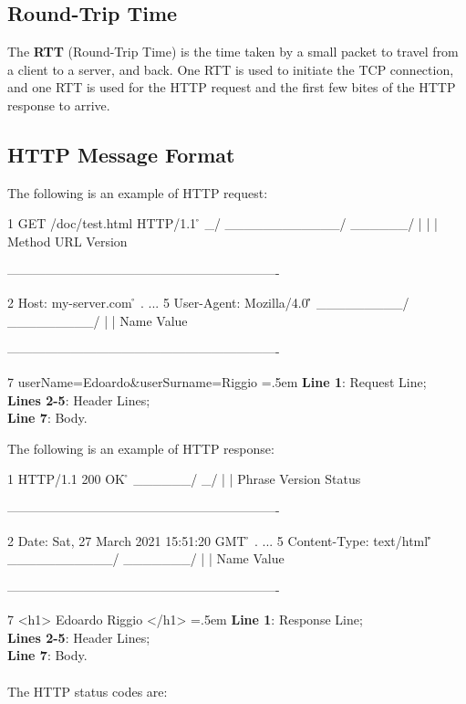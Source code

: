 \documentclass{article}
\newenvironment{lcverbatim}
 {\SaveVerbatim{cverb}}
 {\endSaveVerbatim
  \flushleft\fboxrule=0pt\fboxsep=.5em
  \colorbox{cverbbg}{%
    \makebox[\dimexpr\linewidth-2\fboxsep][l]{\BUseVerbatim{cverb}}%
  }
  \endflushleft
}
\begin{document}
\subsection{Round-Trip Time}
The \textbf{RTT} (Round-Trip Time) is the time taken by a small packet to travel from a client to a server, and back. One RTT is used to initiate the TCP connection, and one RTT is used for the HTTP request and the first few bites of the HTTP response to arrive.

\subsection{HTTP Message Format}

The following is an example of HTTP request:

\begin{lcverbatim}
1  GET /doc/test.html HTTP/1.1 \r\n
   \_/ \____________/ \______/
    |         |          |
   Method    URL       Version
   
----------------------------------------------------------------

2  Host: my-server.com \r\n
.  ...
5  User-Agent: Mozilla/4.0 \r\n\r\n
   \_________/ \_________/
        |           |
       Name       Value
       
----------------------------------------------------------------

7  userName=Edoardo&userSurname=Riggio
\end{lcverbatim}
\textbf{Line 1}: Request Line; \\
\textbf{Lines 2-5}: Header Lines; \\
\textbf{Line 7}: Body.

\pagebreak

\noindent The following  is an example of HTTP response:

\begin{lcverbatim}
1  HTTP/1.1 200 OK \r\n
   \______/ \_/ \/
       |     |   Phrase
    Version Status
    
----------------------------------------------------------------

2  Date: Sat, 27 March 2021 15:51:20 GMT \r\n
.  ...
5  Content-Type: text/html \r\n\r\n
   \___________/ \_______/
         |           |
        Name       Value
        
----------------------------------------------------------------

7  <h1> Edoardo Riggio </h1>
\end{lcverbatim}
\textbf{Line 1}: Response Line; \\
\textbf{Lines 2-5}: Header Lines; \\
\textbf{Line 7}: Body. \\ \\
The HTTP status codes are:
\end{document}
